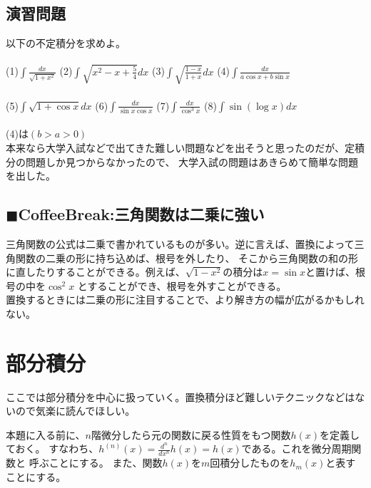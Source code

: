 \documentclass[a4j,dvipdfmx]{jsarticle}
\begin{document}
\subsection{演習問題}
以下の不定積分を求めよ。\\\\
(1)$\displaystyle\int \frac{dx}{\sqrt{1+x^2}}$
\hspace{10mm}
(2)$\displaystyle\int \sqrt{x^2-x+\frac{5}{4}}dx$
\hspace{10mm}
(3)$\displaystyle\int \sqrt{\frac{1-x}{1+x}}dx$
\hspace{10mm}
(4)$\displaystyle\int \frac{dx}{a\cos x+b\sin x}$
\\\\
(5)$\displaystyle\int \sqrt{1+\cos x}dx$
\hspace{3mm}
(6)$\displaystyle\int \frac{dx}{\sin x\cos x}$
\hspace{19mm}
(7)$\displaystyle\int \frac{dx}{\cos^3 x}$
\hspace{17mm}
(8)$\displaystyle\int\sin(\log x)dx$
\\\\
(4)は$(b>a>0)$
\\
本来なら大学入試などで出てきた難しい問題などを出そうと思ったのだが、定積分の問題しか見つからなかったので、
大学入試の問題はあきらめて簡単な問題を出した。

\hrulefill
\subsection{$\blacksquare$CoffeeBreak:三角関数は二乗に強い}
\begin{screen}
    三角関数の公式は二乗で書かれているものが多い。逆に言えば、置換によって三角関数の二乗の形に持ち込めば、根号を外したり、
    そこから三角関数の和の形に直したりすることができる。例えば、$\sqrt{1-x^2}$の積分は$x=\sin x$と置けば、根号の中を$\cos^2 x$
    とすることができ、根号を外すことができる。\\
    置換するときには二乗の形に注目することで、より解き方の幅が広がるかもしれない。
\end{screen}
\newpage
\section{部分積分}
ここでは部分積分を中心に扱っていく。置換積分ほど難しいテクニックなどはないので気楽に読んでほしい。

本題に入る前に、$n$階微分したら元の関数に戻る性質をもつ関数$h(x)$を定義しておく。
すなわち、$\displaystyle h^{(n)}(x)=\frac{d^n}{dx^n}h(x)=h(x)$である。これを微分周期関数と
呼ぶことにする。
また、関数$h(x)$を$m$回積分したものを$h_m(x)$と表すことにする。
\end{document}
